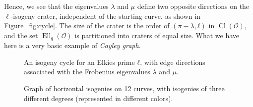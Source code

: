 \documentclass[10pt]{article}
\theoremstyle{plain}
\theoremstyle{definition}
\DeclareMathOperator{\Cl}{Cl}
\DeclareMathOperator{\Ell}{Ell}
\def\O{\ensuremath{\mathcal{O}}}
\begin{document}
Hence, we see that the eigenvalues $λ$ and $μ$ define two opposite
directions on the $\ell$-isogeny crater, independent of the starting
curve, as shown in Figure~\ref{fig:cycle}. %
The size of the crater is the order of $(π-λ,ℓ)$ in $\Cl(\O)$, and the
set $\Ell_q(\O)$ is partitioned into craters of equal size. %
What we have here is a very basic example of \emph{Cayley graph}.

\begin{figure}[t]
  \begin{minipage}{0.45\textwidth}
    \centering
    \caption{An isogeny cycle for an Elkies prime $ℓ$, with edge directions
      associated with the Frobenius eigenvalues $λ$ and $μ$.}
    \label{fig:cycle}
  \end{minipage}
  \hfill
  \begin{minipage}{0.45\textwidth}
    \centering
    \caption{Graph of horizontal isogenies on 12 curves, with isogenies
      of three different degrees (represented in different colors).}
    \label{fig:cayley}
  \end{minipage}
\end{figure}
\end{document}
